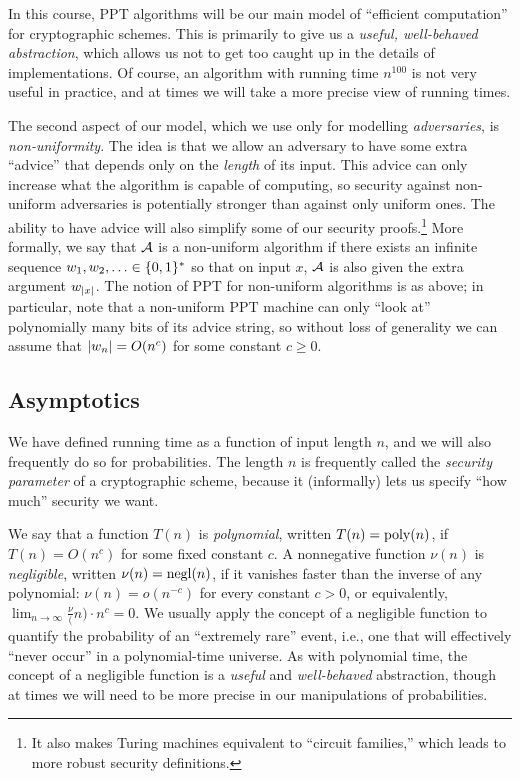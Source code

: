 \documentclass[11pt]{article}
\begin{document}
In this course, PPT algorithms will be our main model of ``efficient
computation'' for cryptographic schemes.  This is primarily to give us
a \emph{useful, well-behaved abstraction}, which allows us not to get
too caught up in the details of implementations.  Of course, an
algorithm with running time $n^{100}$ is not very useful in practice,
and at times we will take a more precise view of running times.

The second aspect of our model, which we use only for modelling
\emph{adversaries}, is \emph{non-uniformity}.  The idea is that we
allow an adversary to have some extra ``advice'' that depends only on
the \emph{length} of its input.  This advice can only increase what
the algorithm is capable of computing, so security against non-uniform
adversaries is potentially stronger than against only uniform ones.
The ability to have advice will also simplify some of our security
proofs.\footnote{It also makes Turing machines equivalent to ``circuit
  families,'' which leads to more robust security definitions.}  More
formally, we say that $\mathcal{A}$ is a non-uniform algorithm if there
exists an infinite sequence $w_{1}, w_{2}, \ldots \in \{0,1\}^{*}$ so
that on input $x$, $\mathcal{A}$ is also given the extra argument
$w_{\lvert x\rvert}$.  The notion of PPT for non-uniform algorithms is as
above; in particular, note that a non-uniform PPT machine can only
``look at'' polynomially many bits of its advice string, so without
loss of generality we can assume that $\lvert w_{n}\rvert = O(n^{c})$ for
some constant $c \geq 0$.

\subsection{Asymptotics}
\label{sec:asymptotics}

We have defined running time as a function of input length $n$, and we
will also frequently do so for probabilities.  The length $n$ is
frequently called the \emph{security parameter} of a cryptographic
scheme, because it (informally) lets us specify ``how much'' security
we want.

We say that a function $T(n)$ is \emph{polynomial}, written $T(n) =
\operatorname{poly}(n)$, if $T(n) = O(n^{c})$ for some fixed constant $c$.  A
nonnegative function $\nu(n)$ is \emph{negligible}, written $\nu(n) =
\operatorname{negl}(n)$, if it vanishes faster than the inverse of any polynomial:
$\nu(n) = o(n^{-c})$ for every constant $c > 0$, or equivalently,
$\lim_{n \to \infty} \tfrac \nu(n) \cdot n^{c} = 0$.  We usually apply
the concept of a negligible function to quantify the probability of an
``extremely rare'' event, i.e., one that will effectively ``never
occur'' in a polynomial-time universe.  As with polynomial time, the
concept of a negligible function is a \emph{useful} and
\emph{well-behaved} abstraction, though at times we will need to be
more precise in our manipulations of probabilities.
\end{document}
